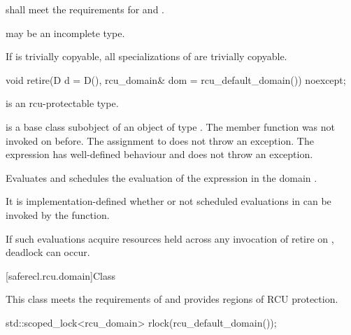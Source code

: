{} shall meet the requirements for
 and .

{} may be an incomplete type.

If  is trivially copyable, all specializations of
 are trivially copyable.

\begin{itemdecl}
void retire(D d = D(), rcu_domain& dom = rcu_default_domain()) noexcept;
\end{itemdecl}

\begin{itemdescr}

\mandates
{} is an rcu-protectable type.

\expects
{} is a base class subobject of
an object  of type . The member function
 was not invoked on 
before. The assignment to  does not throw an
exception. The expression  has
well-defined behaviour and does not throw an exception.

\effects
Evaluates  and schedules
the evaluation of the expression  in the domain .

\remarks
It is implementation-defined whether or not scheduled
evaluations in  can be invoked by the 
function.
\begin{note}
If such evaluations acquire resources held across any invocation of
retire on , deadlock can occur.\end{note}

\end{itemdescr}

[saferecl.rcu.domain]{Class }


This class meets the requirements of   and provides regions of RCU protection.

\begin{example}
\begin{codeblock}
std::scoped_lock<rcu_domain> rlock(rcu_default_domain());
\end{codeblock}
\end{example}

